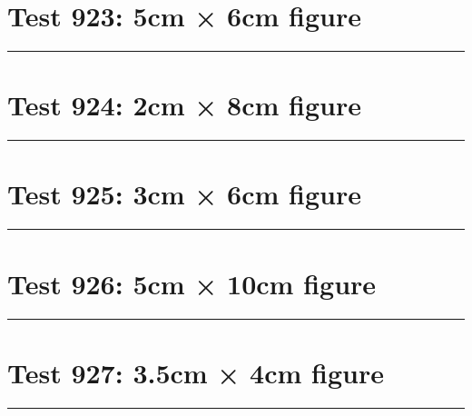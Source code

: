 \documentclass[a4paper,11pt]{article}
\begin{document}
\section*{Test 923: 5cm × 6cm figure}
\begin{swarmwrap}%
  \begin{minipage}[t]{5cm}
    \centering
    \rule{\linewidth}{6cm}
  \end{minipage}%
\end{swarmwrap}%
\swarmwrapnext
\lipsum[19]
\lipsum[20]
\lipsum[21]
\lipsum[22]
\lipsum[23]
\section*{Test 924: 2cm × 8cm figure}
\begin{swarmwrap}%
  \begin{minipage}[t]{2cm}
    \centering
    \rule{\linewidth}{8cm}
  \end{minipage}%
\end{swarmwrap}%
\swarmwrapnext
\lipsum[143]
\lipsum[144]
\lipsum[145]
\lipsum[146]
\lipsum[147]
\lipsum[148]
\section*{Test 925: 3cm × 6cm figure}
\begin{swarmwrap}%
  \begin{minipage}[t]{3cm}
    \centering
    \rule{\linewidth}{6cm}
  \end{minipage}%
\end{swarmwrap}%
\swarmwrapnext
\lipsum[5]
\lipsum[6]
\lipsum[7]
\lipsum[8]
\lipsum[9]
\lipsum[10]
\section*{Test 926: 5cm × 10cm figure}
\begin{swarmwrap}%
  \begin{minipage}[t]{5cm}
    \centering
    \rule{\linewidth}{10cm}
  \end{minipage}%
\end{swarmwrap}%
\swarmwrapnext
\lipsum[30]
\lipsum[31]
\lipsum[32]
\lipsum[33]
\lipsum[34]
\lipsum[35]
\section*{Test 927: 3.5cm × 4cm figure}
\begin{swarmwrap}%
  \begin{minipage}[t]{3cm}
    \centering
    \rule{\linewidth}{4cm}
  \end{minipage}%
\end{swarmwrap}%
\swarmwrapnext
\lipsum[147]
\lipsum[148]
\lipsum[149]
\lipsum[150]
\end{document}
